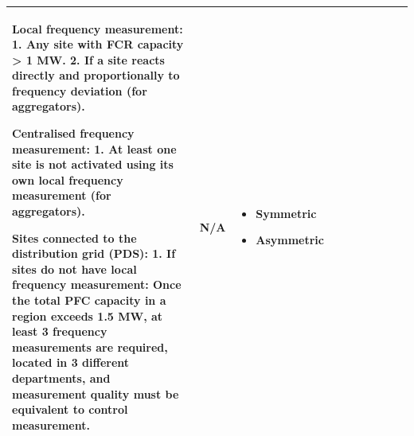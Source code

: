 \begin{landscape}
\begin{longtable}{|p{1.8cm}|p{2.2cm}|p{2.2cm}|p{2.2cm}|p{2.5cm}|p{1.5cm}|p{2.2cm}|p{4cm}|p{2.5cm}|p{2cm}|}
Local frequency measurement:
  1. Any site with FCR capacity > 1 MW.
  2. If a site reacts directly and proportionally to frequency deviation (for aggregators).

Centralised frequency measurement:
  1. At least one site is not activated using its own local frequency measurement (for aggregators).

Sites connected to the distribution grid (PDS):
  1. If sites do not have local frequency measurement:
        Once the total PFC capacity in a region exceeds 1.5 MW,
        at least 3 frequency measurements are required,
        located in 3 different departments,
        and measurement quality must be equivalent to control measurement.
& N/A & 
\begin{itemize}[leftmargin=*, nosep]
  \item Symmetric
  \item Asymmetric
\end{itemize}\\
\hline
\end{longtable}
\normalsize
\end{landscape}





